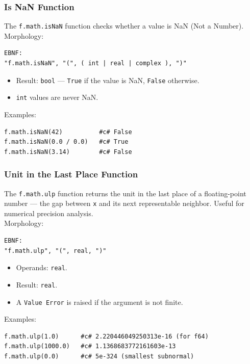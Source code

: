 \subsubsection{Is NaN Function}
The \texttt{f.math.isNaN} function checks whether a value is NaN (Not a Number). \\
Morphology:
\begin{verbatim}
EBNF:
"f.math.isNaN", "(", ( int | real | complex ), ")"
\end{verbatim}
\begin{itemize}
\item Result: \texttt{bool} --- \texttt{True} if the value is NaN, \texttt{False} otherwise.
\item \texttt{int} values are never NaN.
\end{itemize}
Examples:
\begin{verbatim}
f.math.isNaN(42)          #c# False
f.math.isNaN(0.0 / 0.0)   #c# True
f.math.isNaN(3.14)        #c# False
\end{verbatim}

\subsubsection{Unit in the Last Place Function}
The \texttt{f.math.ulp} function returns the unit in the last place of a floating-point number --- the gap between \texttt{x} and its next representable neighbor. Useful for numerical precision analysis. \\
Morphology:
\begin{verbatim}
EBNF:
"f.math.ulp", "(", real, ")"
\end{verbatim}
\begin{itemize}
\item Operands: \texttt{real}.
\item Result: \texttt{real}.
\item A \texttt{Value Error} is raised if the argument is not finite.
\end{itemize}
Examples:
\begin{verbatim}
f.math.ulp(1.0)      #c# 2.220446049250313e-16 (for f64)
f.math.ulp(1000.0)   #c# 1.1368683772161603e-13
f.math.ulp(0.0)      #c# 5e-324 (smallest subnormal)
\end{verbatim}

